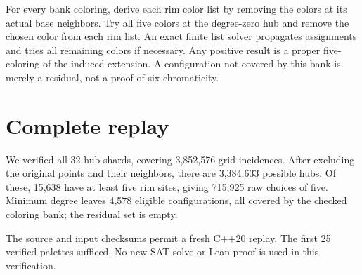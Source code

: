 \documentclass[10pt,letterpaper]{article}
\begin{document}
For every bank coloring, derive each rim color list by removing the
colors at its actual base neighbors. Try all five colors at the
degree-zero hub and remove the chosen color from each rim list. An exact
finite list solver propagates assignments and tries all remaining colors
if necessary. Any positive result is a proper five-coloring of the
induced extension. A configuration not covered by this bank is merely a
residual, not a proof of six-chromaticity.

\section{Complete replay}
We verified all 32 hub shards, covering 3,852,576 grid incidences.
After excluding the original points and their neighbors, there are
3,384,633 possible hubs. Of these, 15,638 have at least five rim
sites, giving 715,925 raw choices of five. Minimum degree leaves
4,578 eligible configurations, all covered by the checked coloring
bank; the residual set is empty.
\par
The source and input checksums permit a fresh C++20 replay.
The first 25 verified palettes sufficed. No new SAT solve or
Lean proof is used in this verification.
\end{document}

